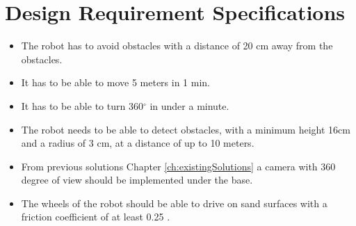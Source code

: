 \section{Design Requirement Specifications} \label{ch:Designrequiremnts}
\begin{itemize}
 
    \item The robot has to avoid obstacles with a distance of 20 cm away from the obstacles.
    \item It has to be able to move 5 meters in 1 min.
    \item It has to be able to turn 360$^{\circ}$ in under a minute.
    \item The robot needs to be able to detect obstacles, with a minimum height 16cm and a radius of 3 cm, at a distance of up to 10 meters.
    \item From previous solutions Chapter \ref{ch:existingSolutions} a camera with 360 degree of view should be implemented under the base\cite{Lidar360}.
    \item The wheels of the robot should be able to drive on sand surfaces with a friction coefficient of at least 0.25 \cite{sand}.

\end{itemize}

